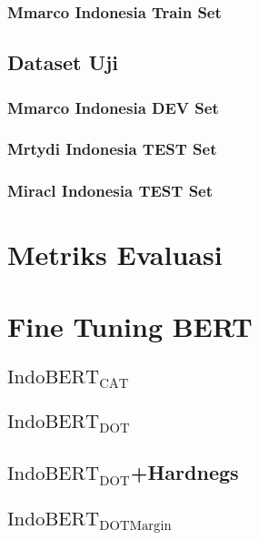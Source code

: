 \subsubsection{Mmarco Indonesia Train Set}


\subsection{Dataset Uji}
\label{sec:datasetuji}

\subsubsection{Mmarco Indonesia DEV Set}

\subsubsection{Mrtydi Indonesia TEST Set}

\subsubsection{Miracl Indonesia TEST Set}

\section{Metriks Evaluasi}
\label{sec:metriksbab4}


\section{Fine Tuning BERT}
\label{sec:finetuning}

\subsection{$\text{IndoBERT}_{\text{CAT}}$}

\subsection{$\text{IndoBERT}_{\text{DOT}}$}

\subsection{$\text{IndoBERT}_{\text{DOT}}$+Hardnegs}

\subsection{$\text{IndoBERT}_{\text{DOTMargin}}$}

